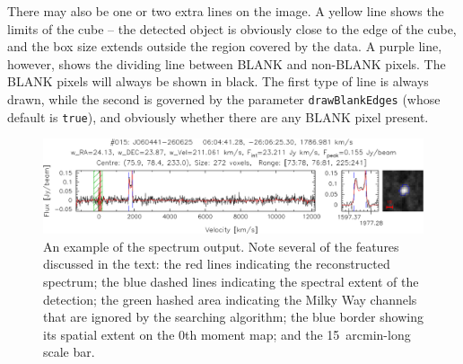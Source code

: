 There may also be one or two extra lines on the image. A yellow line
shows the limits of the cube -- the detected object is obviously close
to the edge of the cube, and the box size extends outside the region
covered by the data. A purple line, however, shows the dividing line
between BLANK and non-BLANK pixels. The BLANK pixels will always be
shown in black. The first type of line is always drawn, while the
second is governed by the parameter \texttt{drawBlankEdges} (whose
default is \texttt{true}), and obviously whether there are any BLANK
pixel present.

\begin{figure}[t]
\begin{center}
\includegraphics[width=\textwidth]{example_spectrum}
\end{center}
\caption{\footnotesize An example of the spectrum output. Note several
  of the features discussed in the text: the red lines indicating the
  reconstructed spectrum; the blue dashed lines indicating the
  spectral extent of the detection; the green hashed area indicating
  the Milky Way channels that are ignored by the searching algorithm;
  the blue border showing its spatial extent on the 0th moment map;
  and the 15~arcmin-long scale bar.}
\label{fig-spect}
\end{figure}


